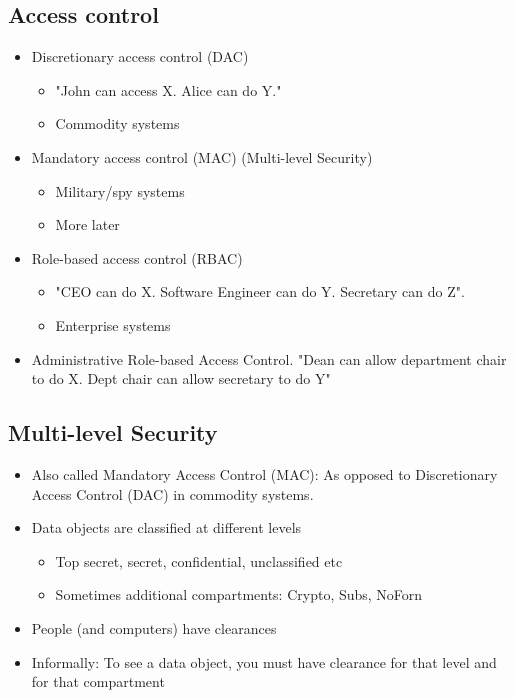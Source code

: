 \documentclass[12pt]{article}
\begin{document}
\subsection{Access control}
\begin{itemize}
    \item Discretionary access control (DAC) \begin{itemize}
        \item "John can access X. Alice can do Y."
        \item Commodity systems
    \end{itemize}
    \item Mandatory access control (MAC) (Multi-level Security) \begin{itemize}
        \item Military/spy systems 
        \item More later
    \end{itemize}
    \item Role-based access control (RBAC) \begin{itemize}
        \item "CEO can do X. Software Engineer can do Y. Secretary can do Z".
        \item Enterprise systems
    \end{itemize}
    \item Administrative Role-based Access Control. "Dean can allow department chair to do X. Dept chair can allow secretary to do Y"
\end{itemize}
\subsection{Multi-level Security}
\begin{itemize}
    \item Also called Mandatory Access Control (MAC): As opposed to Discretionary Access Control (DAC) in commodity systems.
    \item Data objects are classified at different levels \begin{itemize}
        \item Top secret, secret, confidential, unclassified etc
        \item Sometimes additional compartments: Crypto, Subs, NoForn
    \end{itemize}
    \item People (and computers) have clearances
    \item Informally: To see a data object, you must have clearance for that level and for that compartment
\end{itemize}
\end{document}
